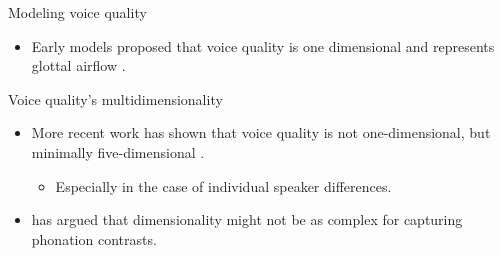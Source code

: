 \documentclass[professionalfonts]{beamer}
\begin{document}
\begin{frame}{Modeling voice quality}
  \begin{itemize}
    \item Early models proposed that voice quality is one dimensional and represents glottal airflow \citep{ladefogedPreliminariesLinguisticPhonetics1971,ladefogedSoundsWorldsLanguages1996}.
  \end{itemize}
  \begin{figure}[h]
  \end{figure}
\end{frame}

\begin{frame}{Voice quality's multidimensionality}
  \begin{itemize}
    \item More recent work has shown that voice quality is not one-dimensional, but minimally five-dimensional \citep[e.g.,][]{garellekModelingVoiceSource2016,kreimanValidatingPsychoacousticModel2021}.
    \begin{itemize}
      \item Especially in the case of individual speaker differences.
    \end{itemize}
    \item \citet{garellekVoiceQualityTone2013} has argued that dimensionality might not be as complex for capturing phonation contrasts.
  \end{itemize}
\end{frame}
\end{document}
